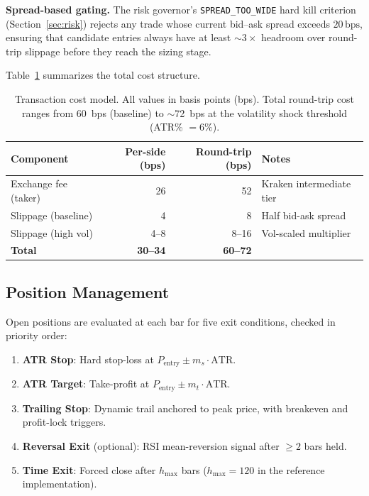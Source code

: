 \documentclass{article}
\newcommand{\bps}{\,\text{bps}}
\begin{document}
\textbf{Spread-based gating.} The risk governor's \texttt{SPREAD\_TOO\_WIDE} hard kill criterion (Section~\ref{sec:risk}) rejects any trade whose current bid--ask spread exceeds $20\bps$, ensuring that candidate entries always have at least ${\sim}3\times$ headroom over round-trip slippage before they reach the sizing stage.

Table~\ref{tab:costs} summarizes the total cost structure.

\begin{table}[h]
\centering
\caption{Transaction cost model. All values in basis points (bps). Total round-trip cost ranges from 60~bps (baseline) to ${\sim}$72~bps at the volatility shock threshold (ATR\% $= 6\%$).}
\label{tab:costs}
\small
\begin{tabular}{@{}lrrl@{}}
\toprule
\textbf{Component} & \textbf{Per-side (bps)} & \textbf{Round-trip (bps)} & \textbf{Notes} \\
\midrule
Exchange fee (taker) & 26 & 52 & Kraken intermediate tier \\
Slippage (baseline) & 4 & 8 & Half bid-ask spread \\
Slippage (high vol) & 4--8 & 8--16 & Vol-scaled multiplier \\
\midrule
\textbf{Total} & \textbf{30--34} & \textbf{60--72} & \\
\bottomrule
\end{tabular}
\end{table}

\subsection{Position Management}

Open positions are evaluated at each bar for five exit conditions, checked in priority order:

\begin{enumerate}[nosep]
  \item \textbf{ATR Stop}: Hard stop-loss at $P_{\text{entry}} \pm m_s \cdot \text{ATR}$.
  \item \textbf{ATR Target}: Take-profit at $P_{\text{entry}} \pm m_t \cdot \text{ATR}$.
  \item \textbf{Trailing Stop}: Dynamic trail anchored to peak price, with breakeven and profit-lock triggers.
  \item \textbf{Reversal Exit} (optional): RSI mean-reversion signal after $\geq 2$ bars held.
  \item \textbf{Time Exit}: Forced close after $h_{\max}$ bars ($h_{\max} = 120$ in the reference implementation).
\end{enumerate}
\end{document}

